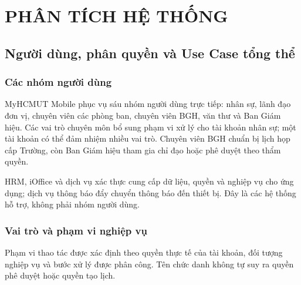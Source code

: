 \chapter{PHÂN TÍCH HỆ THỐNG}
\label{chap:phantich_yeucau}
\label{chap:phantich_dacta_yeucau}



\section{Người dùng, phân quyền và Use Case tổng thể}
\label{sec:nguoidung_rbac_usecase}

\subsection{Các nhóm người dùng}
\label{subsec:nhom_nguoidung}

MyHCMUT Mobile phục vụ sáu nhóm người dùng trực tiếp: nhân sự, lãnh đạo đơn vị, chuyên viên các phòng ban, chuyên viên BGH, văn thư và Ban Giám hiệu. Các vai trò chuyên môn bổ sung phạm vi xử lý cho tài khoản nhân sự; một tài khoản có thể đảm nhiệm nhiều vai trò. Chuyên viên BGH chuẩn bị lịch họp cấp Trường, còn Ban Giám hiệu tham gia chỉ đạo hoặc phê duyệt theo thẩm quyền.

HRM, iOffice và dịch vụ xác thực cung cấp dữ liệu, quyền và nghiệp vụ cho ứng dụng; dịch vụ thông báo đẩy chuyển thông báo đến thiết bị. Đây là các hệ thống hỗ trợ, không phải nhóm người dùng.

\subsection{Vai trò và phạm vi nghiệp vụ}
\label{subsec:nguyentac_phanquyen}

Phạm vi thao tác được xác định theo quyền thực tế của tài khoản, đối tượng nghiệp vụ và bước xử lý được phân công. Tên chức danh không tự suy ra quyền phê duyệt hoặc quyền tạo lịch.

